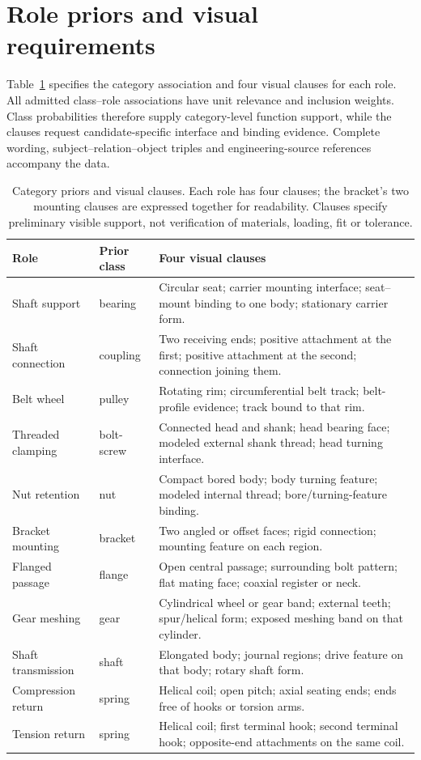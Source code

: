 \documentclass[10pt,a4paper]{article}
\begin{document}
\section{Role priors and visual requirements}

Table~\ref{tab:requirements} specifies the category association and four visual
clauses for each role. All admitted class--role associations have unit relevance
and inclusion weights. Class probabilities therefore supply category-level
function support, while the clauses request candidate-specific interface and
binding evidence. Complete wording, subject--relation--object triples and
engineering-source references accompany the data.

\begin{table}[htbp]\centering\small
\begin{tabularx}{\textwidth}{@{}p{27mm}p{19mm}X@{}}
\toprule
Role & Prior class & Four visual clauses \\
\midrule
Shaft support & bearing & Circular seat; carrier mounting interface; seat--mount binding to one body; stationary carrier form. \\
Shaft connection & coupling & Two receiving ends; positive attachment at the first; positive attachment at the second; connection joining them. \\
Belt wheel & pulley & Rotating rim; circumferential belt track; belt-profile evidence; track bound to that rim. \\
Threaded clamping & bolt-screw & Connected head and shank; head bearing face; modeled external shank thread; head turning interface. \\
Nut retention & nut & Compact bored body; body turning feature; modeled internal thread; bore/turning-feature binding. \\
Bracket mounting & bracket & Two angled or offset faces; rigid connection; mounting feature on each region. \\
Flanged passage & flange & Open central passage; surrounding bolt pattern; flat mating face; coaxial register or neck. \\
Gear meshing & gear & Cylindrical wheel or gear band; external teeth; spur/helical form; exposed meshing band on that cylinder. \\
Shaft transmission & shaft & Elongated body; journal regions; drive feature on that body; rotary shaft form. \\
Compression return & spring & Helical coil; open pitch; axial seating ends; ends free of hooks or torsion arms. \\
Tension return & spring & Helical coil; first terminal hook; second terminal hook; opposite-end attachments on the same coil. \\
\bottomrule
\end{tabularx}
\caption{Category priors and visual clauses. Each role has four clauses; the bracket's two mounting clauses are expressed together for readability. Clauses specify preliminary visible support, not verification of materials, loading, fit or tolerance.}
\label{tab:requirements}
\end{table}
\end{document}
